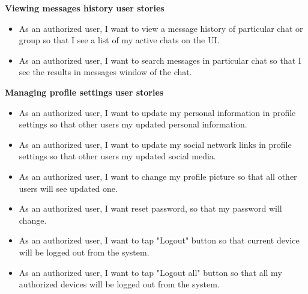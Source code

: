 \textbf{Viewing messages history user stories}
\begin{itemize}
    \item As an authorized user, I want to view a message history of particular chat or group so that I see a list of
    my active chats on the UI\@.
    \item As an authorized user, I want to search messages in particular chat so that I see the results in messages
    window of the chat.
\end{itemize}

\textbf{Managing profile settings user stories}
\begin{itemize}
    \item As an authorized user, I want to update my personal information in profile settings so that other users my
    updated personal information.
    \item As an authorized user, I want to update my social network links in profile settings so that other users
    my updated social media.
    \item As an authorized user, I want to change my profile picture so that all other users will see updated one.
    \item As an authorized user, I want reset password, so that my password will change.
    \item As an authorized user, I want to tap "Logout" button so that current device will be logged out from the system.
    \item As an authorized user, I want to tap "Logout all" button so that all my authorized devices will be logged out
    from the system.
\end{itemize}